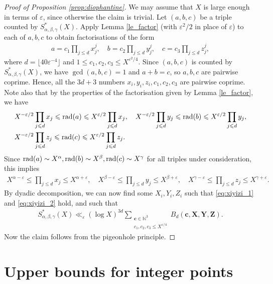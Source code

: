 \begin{proof}[Proof of Proposition \ref{prop:diophantine}] We may assume that $X$ is large enough in terms of $\varepsilon$, since otherwise the claim is trivial. Let $(a,b,c)$ be a triple counted by $S^*_{\alpha,\beta,\gamma}(X)$. Apply Lemma \ref{le_factor} (with $\varepsilon^2/2$ in place of $\varepsilon$) to each of $a,b,c$ to obtain factorisations of the form
\begin{align*}
a=c_1\prod_{j\leq d}x_j^j,\quad b=c_2\prod_{j\leq d}y_j^j,\quad c=c_3\prod_{j\leq d}z_j^j,
\end{align*}
where $d=\lfloor 40\varepsilon^{-4}\rfloor$ and $1\leq c_1,c_2,c_3\leq X^{\varepsilon^2/4}$. Since $(a,b,c)$ is counted by $S^*_{\alpha,\beta,\gamma}(X)$, we have $\gcd(a,b,c)=1$ and $a+b=c$, so $a,b,c$ are pairwise coprime. Hence, all the $3d+3$ numbers $x_i,y_i,z_i,c_1,c_2,c_3$ are pairwise coprime. Note also that by the properties of the factorisation given by Lemma \ref{le_factor}, we have
\begin{align*}
&X^{-\varepsilon/2}\prod_{j\leqslant d}x_j\leqslant \operatorname{rad}(a)\leqslant X^{\varepsilon/2}\prod_{j\leqslant d}x_j,\quad X^{-\varepsilon/2}\prod_{j\leqslant d}y_j\leqslant \operatorname{rad}(b)\leqslant  X^{\varepsilon/2}\prod_{j\leqslant d}y_j,\\
&X^{-\varepsilon/2}\prod_{j\leqslant d}z_j\leqslant \operatorname{rad}(c)\leqslant X^{\varepsilon/2}\prod_{j\leqslant d}z_j.
\end{align*}
Since $\operatorname{rad}(a)\sim X^{\alpha},\operatorname{rad}(b)\sim X^{\beta},\operatorname{rad}(c)\sim X^{\gamma}$ for all triples under consideration, this implies
\begin{align*}
X^{\alpha-\varepsilon}\leq \prod_{j\leq d}x_j\leq X^{\alpha+\varepsilon},\quad  X^{\beta-\varepsilon}\leq \prod_{j\leq d}y_j\leq X^{\beta+\varepsilon},\quad  X^{\gamma-\varepsilon}\leq \prod_{j\leq d}z_j\leq X^{\gamma+\varepsilon}.
\end{align*}
By dyadic decomposition, we can now find some $X_i, Y_i,Z_i$ such that \eqref{eq:xiyizi_1}
and \eqref{eq:xiyizi_2}
 hold,  and such that
\begin{align*}
S^*_{\alpha,\beta,\gamma}(X)\ll_{\varepsilon} (\log X)^{3d} \sum_{\substack{\mathbf{c}\in \mathbb{N}^3\\
c_1,c_2,c_3
\leq X^{\varepsilon/4}}}B_d(\mathbf{c},\mathbf{X},\mathbf{Y},\mathbf{Z}).
\end{align*}
Now the claim follows from the pigeonhole principle.
\end{proof}



\chapter{Upper bounds for integer points}

